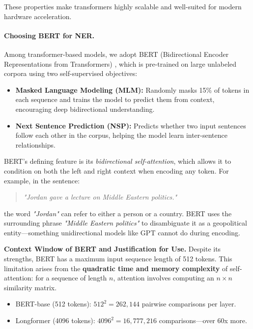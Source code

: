 \documentclass{article}
\begin{document}
These properties make transformers highly scalable and well-suited for modern hardware acceleration.

\vspace{3mm}
\paragraph{Choosing BERT for NER.}

Among transformer-based models, we adopt BERT (Bidirectional Encoder Representations from Transformers) \cite{devlin2018bert}, which is pre-trained on large unlabeled corpora using two self-supervised objectives:

\begin{itemize}
    \item \textbf{Masked Language Modeling (MLM):} Randomly masks 15\% of tokens in each sequence and trains the model to predict them from context, encouraging deep bidirectional understanding.
    \item \textbf{Next Sentence Prediction (NSP):} Predicts whether two input sentences follow each other in the corpus, helping the model learn inter-sentence relationships.
\end{itemize}

BERT’s defining feature is its \emph{bidirectional self-attention}, which allows it to condition on both the left and right context when encoding any token. For example, in the sentence:

\begin{quote}
    \textit{"Jordan gave a lecture on Middle Eastern politics."}
\end{quote}

the word \textit{"Jordan"} can refer to either a person or a country. BERT uses the surrounding phrase \textit{"Middle Eastern politics"} to disambiguate it as a geopolitical entity—something unidirectional models like GPT cannot do during encoding.

\vspace{3mm}
\noindent\textbf{Context Window of BERT and Justification for Use.}  
Despite its strengths, BERT has a maximum input sequence length of 512 tokens. This limitation arises from the \textbf{quadratic time and memory complexity} of self-attention: for a sequence of length $n$, attention involves computing an $n \times n$ similarity matrix.

\begin{itemize}
    \item BERT-base (512 tokens): $512^2 = 262{,}144$ pairwise comparisons per layer.
    \item Longformer (4096 tokens): $4096^2 = 16{,}777{,}216$ comparisons—over 60x more.
\end{itemize}
\end{document}
